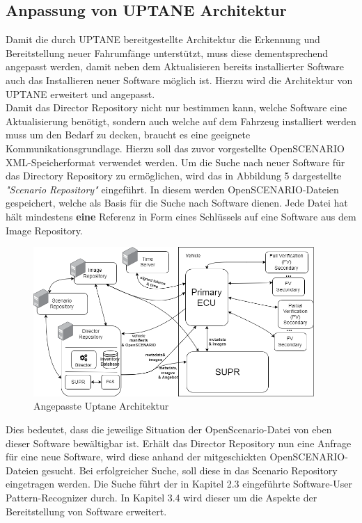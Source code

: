 \subsection{Anpassung von UPTANE Architektur}
Damit die durch UPTANE bereitgestellte Architektur die Erkennung und Bereitstellung neuer Fahrumfänge unterstützt, muss diese dementsprechend angepasst werden, damit neben dem Aktualisieren bereits installierter Software auch das Installieren neuer Software möglich ist. Hierzu wird die Architektur von UPTANE erweitert und angepasst.\\

Damit das Director Repository nicht nur bestimmen kann, welche Software eine Aktualisierung benötigt, sondern auch welche auf dem Fahrzeug installiert werden muss um den Bedarf zu decken, braucht es eine geeignete Kommunikationsgrundlage. Hierzu soll das zuvor vorgestellte OpenSCENARIO XML-Speicherformat verwendet werden. Um die Suche nach neuer Software für das Directory Repository zu ermöglichen, wird das in Abbildung 5 dargestellte \textit{"Scenario Repository"} eingeführt. In diesem werden OpenSCENARIO-Dateien gespeichert, welche als Basis für die Suche nach Software dienen. Jede Datei hat hält mindestens \textbf{eine} Referenz in Form eines Schlüssels auf eine Software aus dem Image Repository.
\begin{figure}[H]
	\includegraphics[width=0.95\textwidth]{../pictures/meta_model_fs-uptane-adjusted.png}
	\caption{Angepasste Uptane Architektur}
\end{figure}
Dies bedeutet, dass die jeweilige Situation der OpenScenario-Datei von eben dieser Software bewältigbar ist.  Erhält das Director Repository nun eine Anfrage für eine neue Software, wird diese anhand der mitgeschickten OpenSCENARIO-Dateien gesucht. Bei erfolgreicher Suche, soll diese in das Scenario Repository eingetragen werden. Die Suche führt der in Kapitel 2.3 eingeführte Software-User Pattern-Recognizer durch. In Kapitel 3.4 wird dieser um die Aspekte der Bereitstellung von Software erweitert.\\
